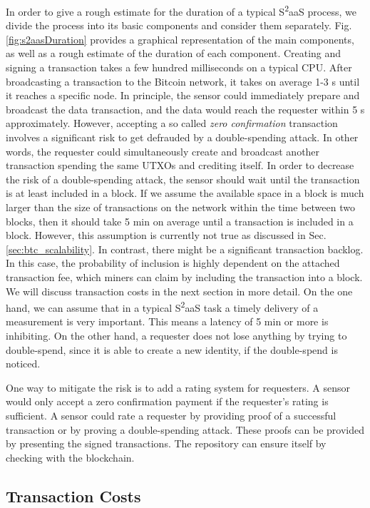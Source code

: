 In order to give a rough estimate for the duration of a typical S\textsuperscript{2}aaS process, we divide the process into its basic components and consider them separately. Fig. \ref{fig:s2aasDuration} provides a graphical representation of the main components, as well as a rough estimate of the duration of each component. Creating and signing a transaction takes a few hundred milliseconds on a typical CPU. After broadcasting a transaction to the Bitcoin network, it takes on average 1-3 s until it reaches a specific node. In principle, the sensor could immediately prepare and broadcast the data transaction, and the data would reach the requester within 5 s approximately. However, accepting a so called \emph{zero confirmation} transaction involves a significant risk to get defrauded by a double-spending attack. In other words, the requester could simultaneously create and broadcast another transaction spending the same \ac{UTXO}s and crediting itself.
In order to decrease the risk of a double-spending attack, the sensor should wait until the transaction is at least included in a block. If we assume the available space in a block is much larger than the size of transactions on the network within the time between two blocks, then it should take 5 min on average until a transaction is included in a block. However, this assumption is currently not true as discussed in Sec. \ref{sec:btc_scalability}. In contrast, there might be a significant transaction backlog. In this case, the probability of inclusion is highly dependent on the attached transaction fee, which miners can claim by including the transaction into a block. We will discuss transaction costs in the next section in more detail.
On the one hand, we can assume that in a typical S\textsuperscript{2}aaS task a timely delivery of a measurement is very important. This means a latency of 5 min or more is inhibiting. On the other hand, a requester does not lose anything by trying to double-spend, since it is able to create a new identity, if the double-spend is noticed. 

One way to mitigate the risk is to add a rating system for requesters. A sensor would only accept a zero confirmation payment if the requester's rating is sufficient. A sensor could rate a requester by providing proof of a successful transaction or by proving a double-spending attack. These proofs can be provided by presenting the signed transactions. The repository can ensure itself by checking with the blockchain. 

\subsection{Transaction Costs}
\label{sec:s2aas_eval_tc}

